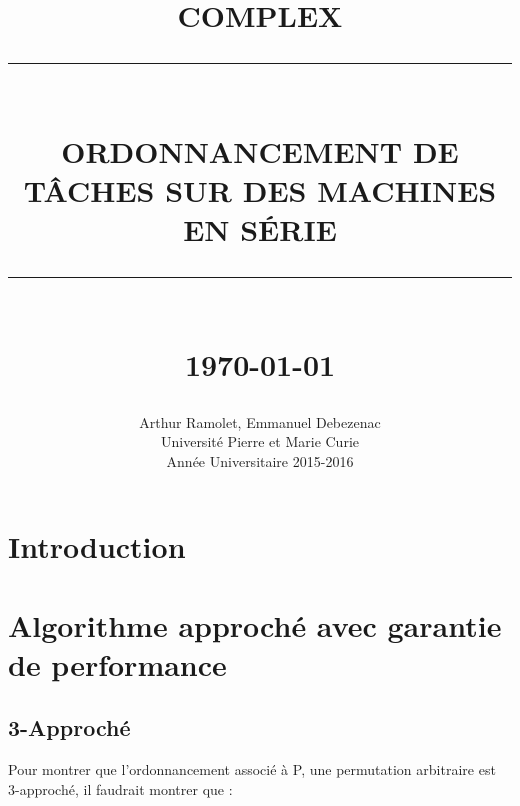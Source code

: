\documentclass[12pt]{article}
\newcommand{\HRule}[1]{\rule{\linewidth}{#1}}
\begin{document}
\title{ \normalsize \textsc{COMPLEX}
		\\ [2.0cm]
		\HRule{0.5pt} \\
		\LARGE \textbf{\uppercase{Ordonnancement de tâches sur des machines en série}}
		\HRule{2pt} \\ [0.5cm]
		\normalsize \today \vspace*{5\baselineskip}}

\date{}

\author{
		Arthur Ramolet, Emmanuel Debezenac \\ 
		Université Pierre et Marie Curie \\
		Année Universitaire 2015-2016 }

\maketitle

\newpage
\tableofcontents

\newpage
\sectionfont{\scshape}



\section{Introduction}




\section{Algorithme approché avec garantie de performance}



\subsection{3-Approché}

Pour montrer que l'ordonnancement associé à P, une permutation arbitraire est 3-approché, il faudrait montrer que : \\
\end{document}
